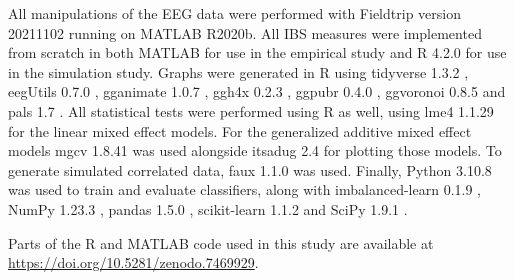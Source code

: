 All manipulations of the EEG data were performed with Fieldtrip version
20211102 \parencite{oostenveld_fieldtrip_2011} running on MATLAB R2020b. All
IBS measures were implemented from scratch in both MATLAB for use in the
empirical study and R 4.2.0 \parencite{r_core_team_r_2022} for use in the
simulation study. Graphs were generated in R using tidyverse 1.3.2
\parencite{wickham_welcome_2019}, eegUtils 0.7.0
\parencite{craddock_eegutils_2022}, gganimate 1.0.7
\parencite{pedersen_gganimate_2020}, ggh4x 0.2.3
\parencite{van_den_brand_ggh4x_2022}, ggpubr 0.4.0
\parencite{kassambara_ggpubr_2020}, ggvoronoi 0.8.5
\parencite{garrett_ggvoronoi_2022} and pals 1.7 \parencite{wright_pals_2021}.
All statistical tests were performed using R as well, using lme4 1.1.29
\parencite{bates_fitting_2015} for the linear mixed effect models. For the
generalized additive mixed effect models mgcv 1.8.41
\parencite{wood_generalized_2006} was used alongside itsadug 2.4
\parencite{van_rij_itsadug_2020} for plotting those models. To generate
simulated correlated data, faux 1.1.0 \parencite{debruine_faux_2021} was used.
Finally, Python 3.10.8 \parencite{python_software_foundation_python_2021} was
used to train and evaluate classifiers, along with imbalanced-learn 0.1.9
\parencite{lemaitre_imbalanced-learn_2017}, NumPy 1.23.3
\parencite{harris_array_2020}, pandas 1.5.0 \parencite{mckinney_data_2010},
scikit-learn 1.1.2 \parencite{pedregosa_scikit-learn_2011} and SciPy 1.9.1
\parencite{virtanen_scipy_2020}.

Parts of the R and MATLAB code used in this study are available at
\url{https://doi.org/10.5281/zenodo.7469929}.
